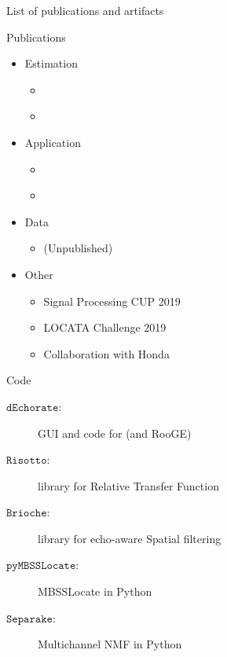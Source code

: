 \begin{frame}{List of publications and artifacts}
    \begin{block}{Publications}
    \begin{itemize}
        \small
        \item Estimation
        \begin{itemize}
            \item \lantern \cite{di2019mirage}
            \item \dechorate \cite{di2020blaster}
        \end{itemize}
        \item Application
        \begin{itemize}
            \item \mirage \cite{di2019mirage}
            \item \separake \cite{scheibler2018separake}
        \end{itemize}
        \item Data
        \begin{itemize}
            \item \dechorate (Unpublished)
        \end{itemize}
        \item Other
        \begin{itemize}
            \item Signal Processing CUP 2019 \cite{deleforge2019audio}
            \item LOCATA Challenge 2019 \cite{lebarbenchon2018evaluation}
            \item Collaboration with Honda \cite{di2019honda}
        \end{itemize}
    \end{itemize}
    \end{block}

    \begin{block}{Code}
        \small
        \begin{description}
            \item[$\mathtt{dEchorate}$:] GUI and code for \dechorate (and RooGE)
            \item[$\mathtt{Risotto}$:] library for Relative Transfer Function
            \item[$\mathtt{Brioche}$:] library for echo-aware Spatial filtering
            \item[$\mathtt{pyMBSSLocate}$:] MBSSLocate in Python
            \item[$\mathtt{Separake}$:] Multichannel NMF in Python
        \end{description}
    \end{block}
\end{frame}